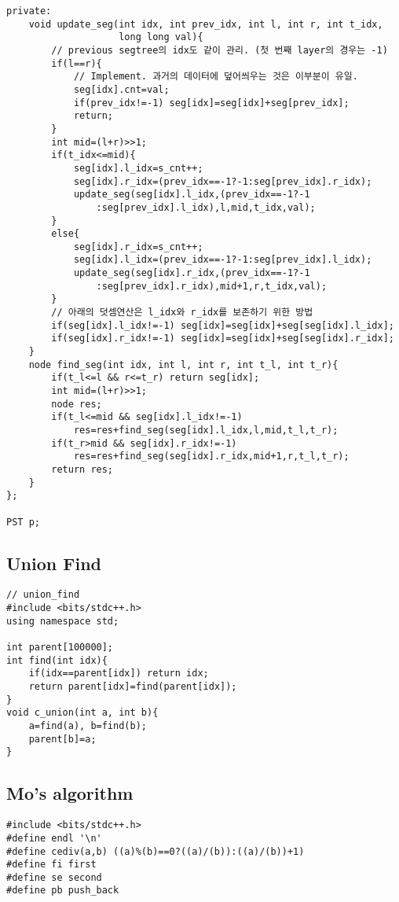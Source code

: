 \documentclass[10pt, landscape]{article}
\begin{document}
\begin{multicols}{2}
\begin{verbatim}
private:
    void update_seg(int idx, int prev_idx, int l, int r, int t_idx, 
                    long long val){
        // previous segtree의 idx도 같이 관리. (첫 번째 layer의 경우는 -1)
        if(l==r){
            // Implement. 과거의 데이터에 덮어씌우는 것은 이부분이 유일.
            seg[idx].cnt=val;
            if(prev_idx!=-1) seg[idx]=seg[idx]+seg[prev_idx];
            return;
        }
        int mid=(l+r)>>1;
        if(t_idx<=mid){
            seg[idx].l_idx=s_cnt++;
            seg[idx].r_idx=(prev_idx==-1?-1:seg[prev_idx].r_idx);
            update_seg(seg[idx].l_idx,(prev_idx==-1?-1
                :seg[prev_idx].l_idx),l,mid,t_idx,val);
        }
        else{
            seg[idx].r_idx=s_cnt++;
            seg[idx].l_idx=(prev_idx==-1?-1:seg[prev_idx].l_idx);
            update_seg(seg[idx].r_idx,(prev_idx==-1?-1
                :seg[prev_idx].r_idx),mid+1,r,t_idx,val);
        }
        // 아래의 덧셈연산은 l_idx와 r_idx를 보존하기 위한 방법 
        if(seg[idx].l_idx!=-1) seg[idx]=seg[idx]+seg[seg[idx].l_idx];
        if(seg[idx].r_idx!=-1) seg[idx]=seg[idx]+seg[seg[idx].r_idx];
    }
    node find_seg(int idx, int l, int r, int t_l, int t_r){
        if(t_l<=l && r<=t_r) return seg[idx];
        int mid=(l+r)>>1;
        node res;
        if(t_l<=mid && seg[idx].l_idx!=-1) 
            res=res+find_seg(seg[idx].l_idx,l,mid,t_l,t_r);
        if(t_r>mid && seg[idx].r_idx!=-1) 
            res=res+find_seg(seg[idx].r_idx,mid+1,r,t_l,t_r);
        return res;
    }
};

PST p;
\end{verbatim}

\subsection{Union Find}
\begin{verbatim}
// union_find
#include <bits/stdc++.h>
using namespace std;

int parent[100000];
int find(int idx){
	if(idx==parent[idx]) return idx;
	return parent[idx]=find(parent[idx]);
}
void c_union(int a, int b){
	a=find(a), b=find(b);
	parent[b]=a;
}
\end{verbatim}

\subsection{Mo's algorithm}
\begin{verbatim}
#include <bits/stdc++.h>
#define endl '\n'
#define cediv(a,b) ((a)%(b)==0?((a)/(b)):((a)/(b))+1)
#define fi first
#define se second
#define pb push_back


\end{verbatim}
\end{multicols}
\end{document}
